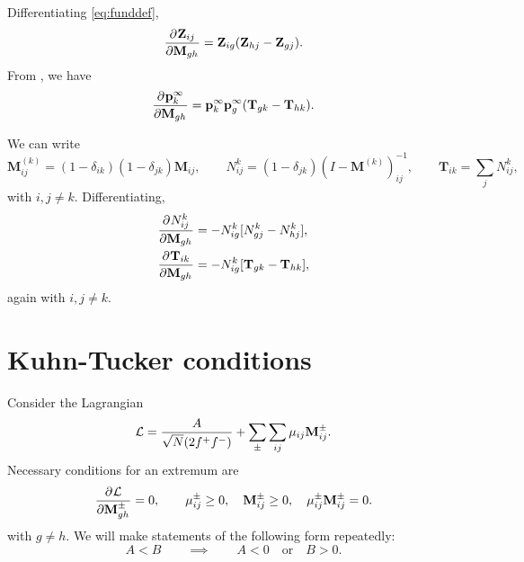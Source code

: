 \documentclass[12pt]{article}
\newcommand{\M}{\mathbf{M}}
\newcommand{\pp}{\mathbf{p}^\infty}
\newcommand{\T}{\mathbf{T}}
\newcommand{\Zb}{\mathbf{Z}}
\begin{document}
Differentiating \eqref{eq:funddef},
%
\begin{equation}\label{eq:fundderiv}
  \pdiff{\Zb_{ij}}{\M_{gh}} = \Zb_{ig}(\Zb_{hj}-\Zb_{gj}).
\end{equation}
%
From \cite{cho2000markov}, we have
%
\begin{equation}\label{eq:pderiv}
  \pdiff{\pp_k}{\M_{gh}} = \pp_k \pp_g (\T_{gk} - \T_{hk}).
\end{equation}
%

We can write \cite{grinstead1997introduction}
%
\begin{equation}\label{eq:NTexpr}
  \M^{(k)}_{ij} = (1-\delta_{ik})(1-\delta_{jk}) \M_{ij},
  \qquad
  N^k_{ij} = (1-\delta_{jk})(I-\M^{(k)})^{-1}_{ij},
  \qquad
  \T_{ik} = \sum_{j} N^k_{ij},
\end{equation}
%
with $i,j \neq k$. Differentiating,
%
\begin{equation}\label{eq:NTderiv}
\begin{aligned}
  \pdiff{N^k_{ij}}{\M_{gh}} &= -N^k_{ig}[ N^k_{gj} - N^k_{hj}],\\
  \pdiff{\T_{ik}}{\M_{gh}} &= -N^k_{ig}[\T_{gk} - \T_{hk}],
\end{aligned}
\end{equation}
%
again with $i,j \neq k$.


\section{Kuhn-Tucker conditions}

Consider the Lagrangian
%
\begin{equation}\label{eq:lagrangian}
  \CL = \frac{A}{\sqrt{N}(2f^+f^-)} + \sum_{\pm}\sum_{ij} \mu_{ij} \M^\pm_{ij}.
\end{equation}
%
Necessary conditions for an extremum are
%
\begin{equation}\label{eq:extremum}
  \pdiff{\CL}{\M^\pm_{gh}} = 0,
  \qquad
    \mu^\pm_{ij} \geq 0,\quad
    \M^\pm_{ij} \geq 0,\quad
    \mu^\pm_{ij}\M^\pm_{ij} = 0.
\end{equation}
%
with $g \neq h$. We will make statements of the following form repeatedly:
%
\begin{equation}\label{eq:ineqstatement}
  A < B \qquad \implies \qquad
  A < 0 \quad \text{or}\quad B > 0.
\end{equation}
%
\end{document}
